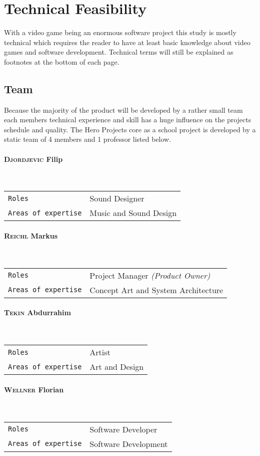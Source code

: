 \documentclass[11pt]{article}
\begin{document}
\section{Technical Feasibility}
With a video game being an enormous software project this study is mostly technical which requires the reader to have at least basic knowledge about video games and software development.
Technical terms will still be explained as footnotes at the bottom of each page.

\subsection{Team}
Because the majority of the product will be developed by a rather small team each members technical experience and skill has a huge influence on the projects schedule and quality.
The Hero Projects core as a school project is developed by a static team of 4 members and 1 professor listed below.
\paragraph{\textsc{Djordjevic} Filip} ~\\
\begin{tabular}{ll}
\texttt{Roles} & Sound Designer\\
\texttt{Areas of expertise} & Music and Sound Design
\end{tabular}
\paragraph{\textsc{Reichl} Markus} ~\\
\begin{tabular}{ll}
\texttt{Roles} & Project Manager \textit{\small{(Product Owner)}}\\
\texttt{Areas of expertise} & Concept Art and System Architecture
\end{tabular}
\paragraph{\textsc{Tekin} Abdurrahim} ~\\
\begin{tabular}{ll}
\texttt{Roles} & Artist\\
\texttt{Areas of expertise} & Art and Design
\end{tabular}
\paragraph{\textsc{Wellner} Florian} ~\\
\begin{tabular}{ll}
\texttt{Roles} & Software Developer\\
\texttt{Areas of expertise} & Software Development
\end{tabular}
\end{document}
